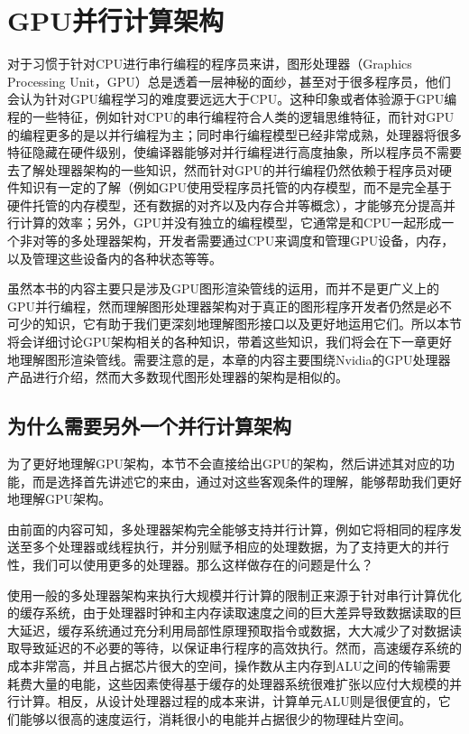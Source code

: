 \section{GPU并行计算架构}
对于习惯于针对CPU进行串行编程的程序员来讲，图形处理器（Graphics Processing Unit，GPU）总是透着一层神秘的面纱，甚至对于很多程序员，他们会认为针对GPU编程学习的难度要远远大于CPU。这种印象或者体验源于GPU编程的一些特征，例如针对CPU的串行编程符合人类的逻辑思维特征，而针对GPU的编程更多的是以并行编程为主；同时串行编程模型已经非常成熟，处理器将很多特征隐藏在硬件级别，使编译器能够对并行编程进行高度抽象，所以程序员不需要去了解处理器架构的一些知识，然而针对GPU的并行编程仍然依赖于程序员对硬件知识有一定的了解（例如GPU使用受程序员托管的内存模型，而不是完全基于硬件托管的内存模型，还有数据的对齐以及内存合并等概念），才能够充分提高并行计算的效率；另外，GPU并没有独立的编程模型，它通常是和CPU一起形成一个非对等的多处理器架构，开发者需要通过CPU来调度和管理GPU设备，内存，以及管理这些设备内的各种状态等等。

虽然本书的内容主要只是涉及GPU图形渲染管线的运用，而并不是更广义上的GPU并行编程，然而理解图形处理器架构对于真正的图形程序开发者仍然是必不可少的知识，它有助于我们更深刻地理解图形接口以及更好地运用它们。所以本节将会详细讨论GPU架构相关的各种知识，带着这些知识，我们将会在下一章更好地理解图形渲染管线。需要注意的是，本章的内容主要围绕Nvidia的GPU处理器产品进行介绍，然而大多数现代图形处理器的架构是相似的。




\subsection{为什么需要另外一个并行计算架构}
为了更好地理解GPU架构，本节不会直接给出GPU的架构，然后讲述其对应的功能，而是选择首先讲述它的来由，通过对这些客观条件的理解，能够帮助我们更好地理解GPU架构。

由前面的内容可知，多处理器架构完全能够支持并行计算，例如它将相同的程序发送至多个处理器或线程执行，并分别赋予相应的处理数据，为了支持更大的并行性，我们可以使用更多的处理器。那么这样做存在的问题是什么？

使用一般的多处理器架构来执行大规模并行计算的限制正来源于针对串行计算优化的缓存系统，由于处理器时钟和主内存读取速度之间的巨大差异导致数据读取的巨大延迟，缓存系统通过充分利用局部性原理预取指令或数据，大大减少了对数据读取导致延迟的不必要的等待，以保证串行程序的高效执行。然而，高速缓存系统的成本非常高，并且占据芯片很大的空间，操作数从主内存到ALU之间的传输需要耗费大量的电能，这些因素使得基于缓存的处理器系统很难扩张以应付大规模的并行计算。相反，从设计处理器过程的成本来讲，计算单元ALU则是很便宜的，它们能够以很高的速度运行，消耗很小的电能并占据很少的物理硅片空间。

